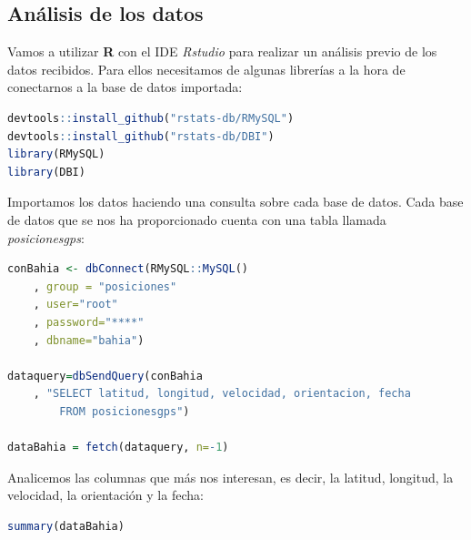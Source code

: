 \documentclass[a4paper, 12pt]{article}
\begin{document}
\pagebreak
\subsection{An\'alisis de los datos}

Vamos a utilizar \textbf{R} con el IDE \textit{Rstudio} para realizar un an\'alisis previo de los datos recibidos. Para ellos necesitamos de algunas librer\'ias a la hora de conectarnos a la base de datos importada:\\

\begin{lstlisting}[language=R, columns=fullflexible, basicstyle=\small, frame=tblr]
devtools::install_github("rstats-db/RMySQL")
devtools::install_github("rstats-db/DBI")
library(RMySQL)
library(DBI)
\end{lstlisting}

\smallskip

Importamos los datos haciendo una consulta sobre cada base de datos. Cada base de datos que se nos ha proporcionado cuenta con una tabla llamada \textit{posicionesgps}:\\

\begin{lstlisting}[language=R, columns=fullflexible, basicstyle=\small,frame=tbrl, showstringspaces=false]
conBahia <- dbConnect(RMySQL::MySQL()
	, group = "posiciones"
	, user="root"
	, password="****"
	, dbname="bahia")

dataquery=dbSendQuery(conBahia
	, "SELECT latitud, longitud, velocidad, orientacion, fecha 
		FROM posicionesgps")

dataBahia = fetch(dataquery, n=-1)
\end{lstlisting}

\smallskip

Analicemos las columnas que m\'as nos interesan, es decir, la latitud, longitud, la velocidad, la orientaci\'on y la fecha: \\

\begin{lstlisting}[language=R, basicstyle=\small, columns=fullflexible, frame=tbrl, showstringspaces=false]
summary(dataBahia)
\end{lstlisting}

\bigskip 
\end{document}
